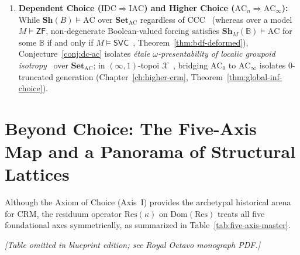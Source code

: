 \begin{enumerate}
  \item \textbf{Dependent Choice ($\mathrm{IDC} \Rightarrow \mathrm{IAC}$) and Higher Choice ($\mathrm{AC}_n \Rightarrow \mathrm{AC}_\infty$):} While $\mathbf{Sh}(B) \models \mathrm{AC}$ over $\mathbf{Set}_{\mathrm{AC}}$ regardless of $\mathrm{CCC}$~\cite{Barr74,Johnstone02} (whereas over a model $M \models \mathsf{ZF}$, non-degenerate Boolean-valued forcing satisfies $\mathbf{Sh}_M(\mathbb{B}) \models \mathrm{AC}$ for some $\mathbb{B}$ if and only if $M \models \mathsf{SVC}$~\cite{Blass79,Usuba21}, Theorem~\ref{thm:bdf-deformed}), Conjecture~\ref{conj:dc-ac} isolates \emph{\'etale $\omega$-presentability of localic groupoid isotropy}~\cite{Johnstone02,Kihara26} over $\mathbf{Set}_{\mathrm{AC}}$; in $(\infty, 1)$-topoi $\mathcal{X}$~\cite{Lurie09}, bridging $\mathrm{AC}_0$ to $\mathrm{AC}_\infty$ isolates $0$-truncated generation (Chapter~\ref{ch:higher-crm}, Theorem~\ref{thm:global-inf-choice}).
\end{enumerate}

\section{Beyond Choice: The Five-Axis Map and a Panorama of Structural Lattices}

Although the Axiom of Choice (Axis~I) provides the archetypal historical arena for $\mathrm{CRM}$, the residuum operator $\mathrm{Res}(\kappa)$ on $\mathrm{Dom}(\mathrm{Res})$ treats all five foundational axes symmetrically, as summarized in Table~\ref{tab:five-axis-master}.

\begin{center}\emph{[Table omitted in blueprint edition; see Royal Octavo monograph PDF.]}\label{tab:five-axis-master}\end{center}

